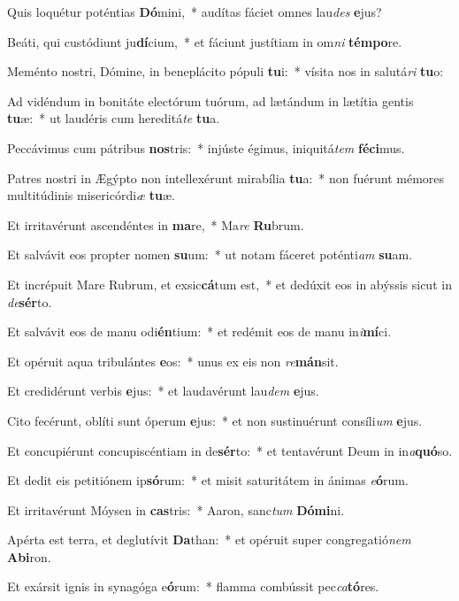 \item Quis loquétur poténtias \textbf{Dó}mini,~* audítas fáciet omnes lau\textit{des} \textbf{e}jus?
\item Beáti, qui custódiunt ju\textbf{dí}cium,~* et fáciunt justítiam in om\textit{ni} \textbf{tém}\textbf{po}re.
\item Meménto nostri, Dómine, in beneplácito pópuli \textbf{tu}i:~* vísita nos in salutá\textit{ri} \textbf{tu}o:
\item Ad vidéndum in bonitáte electórum tuórum, ad lætándum in lætítia gentis \textbf{tu}æ:~* ut laudéris cum hereditá\textit{te} \textbf{tu}a.
\item Peccávimus cum pátribus \textbf{nos}tris:~* injúste égimus, iniquitá\textit{tem} \textbf{fé}\textbf{ci}mus.
\item Patres nostri in Ægýpto non intellexérunt mirabília \textbf{tu}a:~* non fuérunt mémores multitúdinis misericórdi\textit{æ} \textbf{tu}æ.
\item Et irritavérunt ascendéntes in \textbf{ma}re,~* Ma\textit{re} \textbf{Ru}brum.
\item Et salvávit eos propter nomen \textbf{su}um:~* ut notam fáceret poténti\textit{am} \textbf{su}am.
\item Et incrépuit Mare Rubrum, et exsic\textbf{cá}tum est,~* et dedúxit eos in abýssis sicut in \textit{de}\textbf{sér}to.
\item Et salvávit eos de manu odi\textbf{én}tium:~* et redémit eos de manu in\textit{i}\textbf{mí}ci.
\item Et opéruit aqua tribulántes \textbf{e}os:~* unus ex eis non \textit{re}\textbf{mán}sit.
\item Et credidérunt verbis \textbf{e}jus:~* et laudavérunt lau\textit{dem} \textbf{e}jus.
\item Cito fecérunt, oblíti sunt óperum \textbf{e}jus:~* et non sustinuérunt consíli\textit{um} \textbf{e}jus.
\item Et concupiérunt concupiscéntiam in de\textbf{sér}to:~* et tentavérunt Deum in in\textit{a}\textbf{quó}so.
\item Et dedit eis petitiónem ip\textbf{só}rum:~* et misit saturitátem in ánimas \textit{e}\textbf{ó}rum.
\item Et irritavérunt Móysen in \textbf{cas}tris:~* Aaron, sanc\textit{tum} \textbf{Dó}\textbf{mi}ni.
\item Apérta est terra, et deglutívit \textbf{Da}than:~* et opéruit super congregatió\textit{nem} \textbf{Ab}\textbf{i}ron.
\item Et exársit ignis in synagóga e\textbf{ó}rum:~* flamma combússit pec\textit{ca}\textbf{tó}res.
